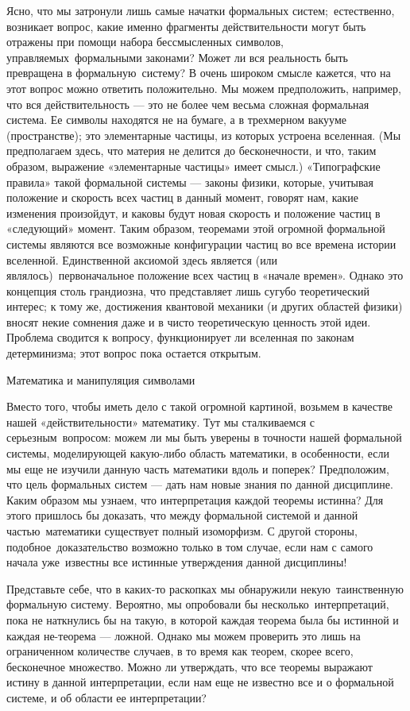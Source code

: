 Ясно, что мы затронули лишь самые начатки формальных систем;~естественно, возникает вопрос, какие именно фрагменты действительности могут быть отражены при помощи набора бессмысленных символов, управляемых~формальными законами? Может ли вся реальность быть превращена в формальную~систему? В очень широком смысле кажется, что на этот вопрос можно ответить положительно. Мы можем предположить, например, что вся действительность --- это не более чем весьма сложная формальная система. Ее символы находятся не на бумаге, а в трехмерном вакууме (пространстве); это элементарные частицы, из которых устроена вселенная. (Мы предполагаем здесь, что материя не делится до бесконечности, и что, таким образом, выражение «элементарные частицы» имеет смысл.) «Типографские правила» такой формальной системы --- законы физики, которые, учитывая положение и скорость всех частиц в данный момент, говорят нам, какие изменения произойдут, и каковы будут новая скорость и положение частиц в «следующий» момент. Таким образом, теоремами этой огромной формальной системы являются все возможные конфигурации частиц во все времена истории вселенной. Единственной аксиомой здесь является (или являлось)~первоначальное положение всех частиц в «начале времен». Однако это концепция столь грандиозна, что представляет лишь сугубо теоретический интерес; к тому же, достижения квантовой механики (и других областей физики) вносят некие сомнения даже и в чисто теоретическую ценность этой идеи. Проблема сводится к вопросу, функционирует ли вселенная по законам детерминизма; этот вопрос пока остается открытым.

Математика и манипуляция символами

Вместо того, чтобы иметь дело с такой огромной картиной, возьмем в качестве нашей «действительности» математику. Тут мы сталкиваемся с серьезным~вопросом: можем ли мы быть уверены в точности нашей формальной системы, моделирующей какую-либо область математики, в особенности, если мы еще не изучили данную часть математики вдоль и поперек? Предположим, что цель формальных систем --- дать нам новые знания по данной дисциплине. Каким образом мы узнаем, что интерпретация каждой теоремы истинна? Для этого пришлось бы доказать, что между формальной системой и данной частью~математики существует полный изоморфизм. С другой стороны, подобное~доказательство возможно только в том случае, если нам с самого начала уже~известны все истинные утверждения данной дисциплины!

Представьте себе, что в каких-то раскопках мы обнаружили некую~таинственную формальную систему. Вероятно, мы опробовали бы несколько~интерпретаций, пока не наткнулись бы на такую, в которой каждая теорема была бы истинной и каждая не-теорема --- ложной. Однако мы можем проверить это лишь на ограниченном количестве случаев, в то время как теорем, скорее всего, бесконечное множество. Можно ли утверждать, что все теоремы выражают истину в данной интерпретации, если нам еще не известно все и о формальной системе, и об области ее интерпретации?

